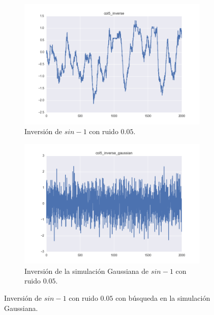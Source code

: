 \documentclass[11pt,spanish,listoffigures,listoftables]{tfgetsinf}
\begin{document}
    \begin{figure}[H]
        \centering
        \begin{subfigure}[h]{0.49\textwidth}
            \centering
            \includegraphics[width=\textwidth]{simulated_data_8_columns/col5_inverse.png}
            \caption{Inversión de \(sin - 1\) con ruido \(0.05\).}
            \label{fig:col5_inverse}
        \end{subfigure}
        \begin{subfigure}[h]{0.49\textwidth}
            \centering
            \includegraphics[width=\textwidth]{simulated_data_8_columns/col5_inverse_gaussian.png}
            \caption{Inversión de la simulación Gaussiana de \(sin - 1\) con ruido \(0.05\).}
            \label{fig:col5_inverse_gaussian}
        \end{subfigure}
        \caption{Inversión de \(sin - 1\) con ruido \(0.05\) con búsqueda en la simulación Gaussiana.}
        \label{fig:col5_inverse_all}
    \end{figure}
\end{document}
